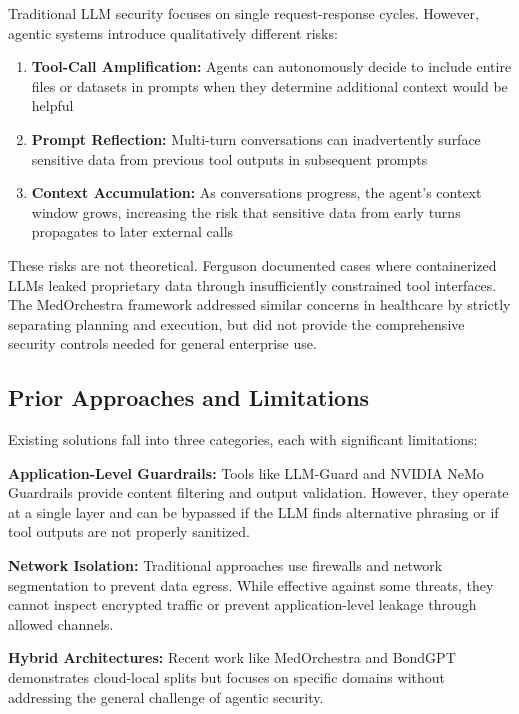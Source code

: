 \documentclass[11pt]{article}
\begin{document}
Traditional LLM security focuses on single request-response cycles. However, agentic systems introduce qualitatively different risks:

\begin{enumerate}
\item \textbf{Tool-Call Amplification:} Agents can autonomously decide to include entire files or datasets in prompts when they determine additional context would be helpful
\item \textbf{Prompt Reflection:} Multi-turn conversations can inadvertently surface sensitive data from previous tool outputs in subsequent prompts
\item \textbf{Context Accumulation:} As conversations progress, the agent's context window grows, increasing the risk that sensitive data from early turns propagates to later external calls
\end{enumerate}

These risks are not theoretical. Ferguson \cite{ferguson2025} documented cases where containerized LLMs leaked proprietary data through insufficiently constrained tool interfaces. The MedOrchestra framework \cite{medorchestra2025} addressed similar concerns in healthcare by strictly separating planning and execution, but did not provide the comprehensive security controls needed for general enterprise use.

\subsection{Prior Approaches and Limitations}

Existing solutions fall into three categories, each with significant limitations:

\textbf{Application-Level Guardrails:} Tools like LLM-Guard \cite{llmguard2024} and NVIDIA NeMo Guardrails \cite{nvidia2024} provide content filtering and output validation. However, they operate at a single layer and can be bypassed if the LLM finds alternative phrasing or if tool outputs are not properly sanitized.

\textbf{Network Isolation:} Traditional approaches use firewalls and network segmentation to prevent data egress. While effective against some threats, they cannot inspect encrypted traffic or prevent application-level leakage through allowed channels.

\textbf{Hybrid Architectures:} Recent work like MedOrchestra \cite{medorchestra2025} and BondGPT \cite{broadridge2025} demonstrates cloud-local splits but focuses on specific domains without addressing the general challenge of agentic security.
\end{document}

